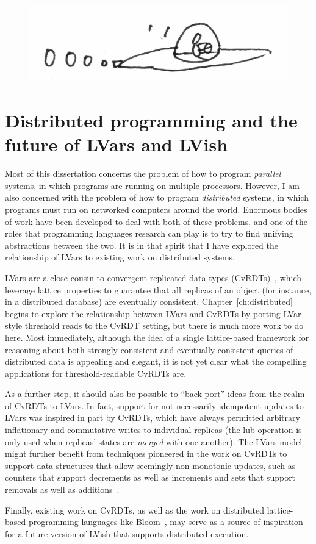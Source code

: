 \ifdefined\DISSERTATION
\begin{figure}[h]
  \vspace{-1em}
  \begin{center}
    \includegraphics[scale=0.15]{../illustrations/flying-saucer}
  \end{center}
  \vspace{-1em}
\end{figure}
\fi

\ifdefined\DISSERTATION
\section{Distributed programming and the future of LVars and LVish}

Most of this dissertation concerns the problem of how to program
\emph{parallel} systems, in which programs are running on multiple
processors.  However, I am also concerned with the problem of how to
program \emph{distributed} systems, in which programs must run on
networked computers around the world.  Enormous bodies of work have
been developed to deal with both of these problems, and one of the
roles that programming languages research can play is to try to find
unifying abstractions between the two. It is in that spirit that I
have explored the relationship of LVars to existing work on
distributed systems.

LVars are a close cousin to convergent replicated data types
(CvRDTs)~\cite{crdts,crdts-tr}, which leverage lattice properties to
guarantee that all replicas of an object (for instance, in a
distributed database) are eventually consistent.
Chapter~\ref{ch:distributed} begins to explore the relationship
between LVars and CvRDTs by porting LVar-style threshold reads to the
CvRDT setting, but there is much more work to do here.  Most
immediately, although the idea of a single lattice-based framework for
reasoning about both strongly consistent and eventually consistent
queries of distributed data is appealing and elegant, it is not yet
clear what the compelling applications for threshold-readable CvRDTs
are.

As a further step, it should also be possible to ``back-port'' ideas
from the realm of CvRDTs to LVars.  In fact, support for
not-necessarily-idempotent updates to LVars was inspired in part by
CvRDTs, which have always permitted arbitrary inflationary and
commutative writes to individual replicas (the lub operation is only
used when replicas' states are \emph{merged} with one another).  The
LVars model might further benefit from techniques pioneered in the
work on CvRDTs to support data structures that allow seemingly
non-monotonic updates, such as counters that support decrements as
well as increments and sets that support removals as well as
additions~\cite{crdts}.

Finally, existing work on CvRDTs, as well as the work on distributed
lattice-based programming languages like Bloom~\cite{bloom-cidr,
  blooml}, may serve as a source of inspiration for a future version
of LVish that supports distributed execution.
\fi
